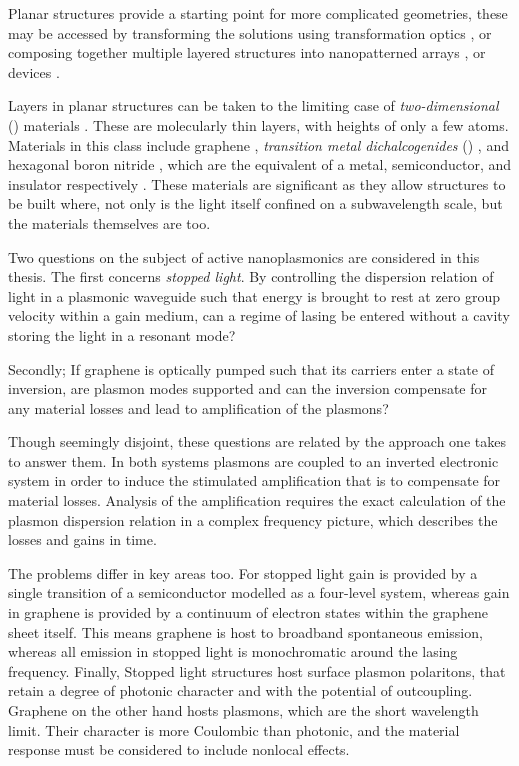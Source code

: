 Planar structures provide a starting point for more complicated geometries,
these may be accessed by transforming the solutions using transformation optics
\cite{Pendry2006,Leonhardt2006},
or composing together multiple layered structures into nanopatterned
arrays \cite{Radko2009,Davies2013}, or devices \cite{Dionne2009}.

Layers in planar structures can be taken to the limiting case of
\emph{two-dimensional} (\twod) materials \cite{Novoselov2005a}.
These are molecularly thin layers, with heights of only a few atoms.
Materials in this class include
graphene \cite{Novoselov2004},
\emph{transition metal dichalcogenides} (\tmds) \cite{Mak2010},
and hexagonal boron nitride \cite{Nagashima1995},
which are the \twod equivalent of a metal, semiconductor, and insulator
respectively \cite{Bharadwaj2015}.
These materials are significant as they allow structures to be built where, not
only is the light itself confined on a subwavelength scale, but the materials
themselves are too.

Two questions on the subject of active nanoplasmonics are considered in this
thesis.
The first concerns \emph{stopped light}.
By controlling the dispersion relation of light in a plasmonic waveguide such
that energy is brought to rest at zero group velocity within a gain medium, can
a regime of lasing be entered without a cavity storing the light in a resonant
mode?

Secondly;
If graphene is optically pumped such that its carriers enter a state of
inversion, are plasmon modes supported and can the inversion compensate for any
material losses and lead to amplification of the plasmons?

Though seemingly disjoint, these questions are related by the approach one takes
to answer them.
In both systems plasmons are coupled to an inverted electronic system in order
to induce the stimulated amplification that is to compensate for material
losses.
Analysis of the amplification requires the exact calculation of the plasmon
dispersion relation in a complex frequency picture, which describes the losses
and gains in time.

The problems differ in key areas too.
For stopped light gain is provided by a
single transition of a \threefive semiconductor modelled as a four-level system,
whereas gain in graphene is provided by a continuum of electron states within
the graphene sheet itself.
This means graphene is host to broadband spontaneous emission, whereas all
emission in stopped light is monochromatic around the lasing frequency.
Finally, Stopped light structures host surface plasmon polaritons, that retain
a degree of photonic character and with the potential of outcoupling.
Graphene on the other hand hosts plasmons, which are the short wavelength limit.
Their character is more Coulombic than photonic, and the material response must
be considered to include nonlocal effects.

